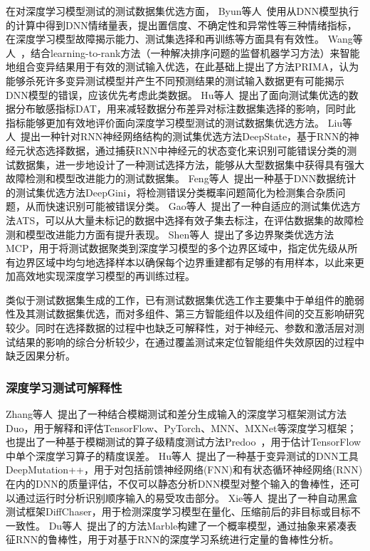 在对深度学习模型测试的测试数据集优选方面，
Byun等人~使用从DNN模型执行的计算中得到DNN情绪量表，提出置信度、不确定性和异常性等三种情绪指标，在深度学习模型故障揭示能力、测试集选择和再训练等方面具有有效性。
Wang等人~，结合learning-to-rank方法（一种解决排序问题的监督机器学习方法）来智能地组合变异结果用于有效的测试输入优选，在此基础上提出了方法PRIMA，认为能够杀死许多变异测试模型并产生不同预测结果的测试输入数据更有可能揭示DNN模型的错误，应该优先考虑此类数据。
Hu等人~提出了面向测试集优选的数据分布敏感指标DAT，用来减轻数据分布差异对标注数据集选择的影响，同时此指标能够更加有效地评价面向深度学习模型测试的测试数据集优选方法。
Liu等人~提出一种针对RNN神经网络结构的测试集优选方法DeepState，基于RNN的神经元状态选择数据，通过捕获RNN中神经元的状态变化来识别可能错误分类的测试数据集，进一步地设计了一种测试选择方法，能够从大型数据集中获得具有强大故障检测和模型改进能力的测试数据集。
Feng等人~提出一种基于DNN数据统计的测试集优选方法DeepGini，将检测错误分类概率问题简化为检测集合杂质问题，从而快速识别可能被错误分类。
Gao等人~提出了一种自适应的测试集优选方法ATS，可以从大量未标记的数据中选择有效子集去标注，在评估数据集的故障检测和模型改进能力方面有提升表现。
Shen等人~提出了多边界聚类优选方法MCP，用于将测试数据聚类到深度学习模型的多个边界区域中，指定优先级从所有边界区域中均匀地选择样本以确保每个边界重建都有足够的有用样本，以此来更加高效地实现深度学习模型的再训练过程。

类似于测试数据集生成的工作，已有测试数据集优选工作主要集中于单组件的脆弱性及其测试数据集优选，而对多组件、第三方智能组件以及组件间的交互影响研究较少。同时在选择数据的过程中也缺乏可解释性，对于神经元、参数和激活层对测试结果的影响的综合分析较少，在通过覆盖测试来定位智能组件失效原因的过程中缺乏因果分析。



\subsubsection{深度学习测试可解释性}

\iffalse
Zhang等人~提出了一种结合模糊测试和差分生成输入的深度学习框架测试方法Duo，用于解释和评估TensorFlow、PyTorch、MNN、MXNet等深度学习框架；也提出了一种基于模糊测试的算子级精度测试方法Predoo~，用于估计TensorFlow中单个深度学习算子的精度误差。
Hu等人~提出了一种基于变异测试的DNN工具DeepMutation++，用于对包括前馈神经网络(FNN)和有状态循环神经网络(RNN)在内的DNN的质量评估，不仅可以静态分析DNN模型对整个输入的鲁棒性，还可以通过运行时分析识别顺序输入的易受攻击部分。
Xie等人~提出了一种自动黑盒测试框架DiffChaser，用于检测深度学习模型在量化、压缩前后的非目标或目标不一致性。
Du等人~提出了的方法Marble构建了一个概率模型，通过抽象来紧凑表征RNN的鲁棒性，用于对基于RNN的深度学习系统进行定量的鲁棒性分析。

